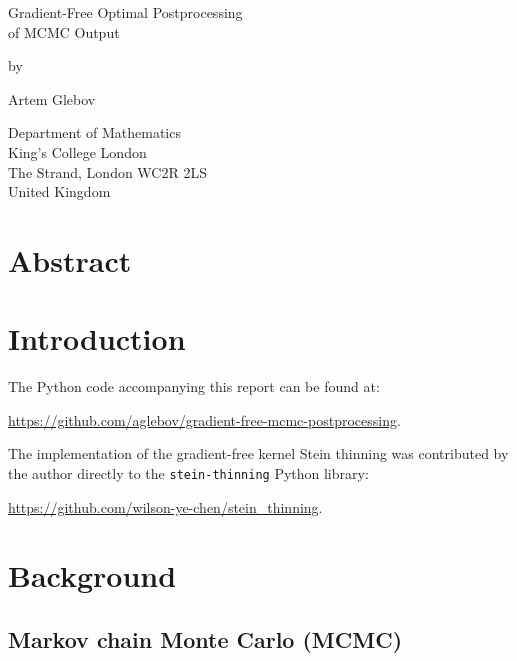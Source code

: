 \documentclass[11pt,a4paper]{report}
\date{}
\begin{document}

\thispagestyle{empty}
\begin{center}
{\huge
Gradient-Free Optimal Postprocessing \\
of MCMC Output

\bigskip
\bigskip

by
\bigskip
\bigskip

Artem Glebov
}
\end{center}
\vfill

\begin{center}
{\large
Department of Mathematics\\
King's College London\\
The Strand, London WC2R 2LS\\
United Kingdom\\
\medskip

}
\end{center}
\bigskip


\newpage
\setcounter{page}{1}
\restoregeometry

\chapter*{Abstract}


\tableofcontents


\chapter*{Introduction}

The Python code accompanying this report can be found at:
\begin{center}
\url{https://github.com/aglebov/gradient-free-mcmc-postprocessing}.
\end{center}

The implementation of the gradient-free kernel Stein thinning was contributed by the author directly to the \texttt{stein-thinning} Python library:
\begin{center}
\url{https://github.com/wilson-ye-chen/stein_thinning}.
\end{center}

\chapter{Background}

\section{Markov chain Monte Carlo (MCMC)}
\end{document}
